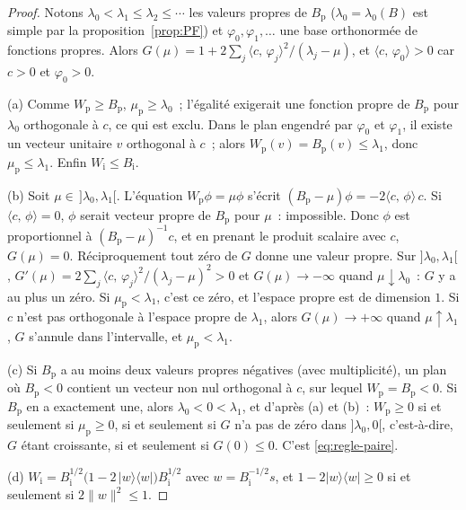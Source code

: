 \documentclass[11pt,a4paper]{article}
\theoremstyle{definition}
\theoremstyle{remark}
\newcommand{\ps}[2]{\langle #1,\,#2\rangle}
\begin{document}
\begin{proof}
Notons $\lambda_0<\lambda_1\le\lambda_2\le\cdots$ les valeurs propres de $B_{\mathrm p}$ ($\lambda_0=\lambda_0(B)$ est simple par la
proposition~\ref{prop:PF}) et $\varphi_0,\varphi_1,\ldots$ une base orthonormée de fonctions propres. Alors
$G(\mu)=1+2\sum_j\ps{c}{\varphi_j}^2/(\lambda_j-\mu)$, et $\ps c{\varphi_0}>0$ car $c>0$ et $\varphi_0>0$.

(a) Comme $W_{\mathrm p}\ge B_{\mathrm p}$, $\mu_{\mathrm p}\ge\lambda_0$~; l'égalité exigerait une fonction propre de $B_{\mathrm p}$ pour $\lambda_0$
orthogonale à $c$, ce qui est exclu. Dans le plan engendré par $\varphi_0$ et $\varphi_1$, il existe un vecteur unitaire $v$
orthogonal à $c$~; alors $W_{\mathrm p}(v)=B_{\mathrm p}(v)\le\lambda_1$, donc $\mu_{\mathrm p}\le\lambda_1$. Enfin $W_{\mathrm i}\le B_{\mathrm i}$.

(b) Soit $\mu\in\,]\lambda_0,\lambda_1[$. L'équation $W_{\mathrm p}\phi=\mu\phi$ s'écrit $(B_{\mathrm p}-\mu)\phi=-2\ps c\phi\,c$. Si $\ps c\phi=0$, $\phi$ serait
vecteur propre de $B_{\mathrm p}$ pour $\mu$~: impossible. Donc $\phi$ est proportionnel à $(B_{\mathrm p}-\mu)^{-1}c$, et en prenant
le produit scalaire avec $c$, $G(\mu)=0$. Réciproquement tout zéro de $G$ donne une valeur propre. Sur $]\lambda_0,\lambda_1[$,
$G'(\mu)=2\sum_j\ps c{\varphi_j}^2/(\lambda_j-\mu)^2>0$ et $G(\mu)\to-\infty$ quand $\mu\downarrow\lambda_0$~: $G$ y a au plus un zéro.
Si $\mu_{\mathrm p}<\lambda_1$, c'est ce zéro, et l'espace propre est de dimension $1$. Si $c$ n'est pas orthogonale à l'espace propre de
$\lambda_1$, alors $G(\mu)\to+\infty$ quand $\mu\uparrow\lambda_1$, $G$ s'annule dans l'intervalle, et $\mu_{\mathrm p}<\lambda_1$.

(c) Si $B_{\mathrm p}$ a au moins deux valeurs propres négatives (avec multiplicité), un plan où $B_{\mathrm p}<0$ contient un vecteur non nul
orthogonal à $c$, sur lequel $W_{\mathrm p}=B_{\mathrm p}<0$. Si $B_{\mathrm p}$ en a exactement une, alors $\lambda_0<0<\lambda_1$, et d'après (a) et (b)~:
$W_{\mathrm p}\ge0$ si et seulement si $\mu_{\mathrm p}\ge0$, si et seulement si $G$ n'a pas de zéro dans $]\lambda_0,0[$, c'est-à-dire, $G$
étant croissante, si et seulement si $G(0)\le0$. C'est \eqref{eq:regle-paire}.

(d) $W_{\mathrm i}=B_{\mathrm i}^{1/2}\bigl(1-2\,|w\rangle\langle w|\bigr)B_{\mathrm i}^{1/2}$ avec $w=B_{\mathrm i}^{-1/2}s$, et $1-2|w\rangle\langle w|\ge0$ si et
seulement si $2\|w\|^2\le1$.
\end{proof}
\end{document}
